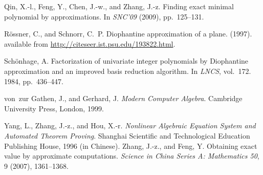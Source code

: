 \documentclass{sig-alternate}
\numberwithin{theorem}{section} \numberwithin{equation}{section}
\begin{document}
\begin{thebibliography}{10}
{\sc Qin, X.-l., Feng, Y., Chen, J.-w., and Zhang, J.-z.}
  Finding exact minimal polynomial by approximations.
  In {\em SNC'09\/} (2009), pp.~125--131.

{\sc R{\"o}ssner, C., and Schnorr, C.~P.}
  Diophantine approximation of a plane. (1997).
  available from \url{http://citeseer.ist.psu.edu/193822.html}.

{\sc Sch{\"o}nhage, A.}
  Factorization of univariate integer polynomials by Diophantine
  approximation and an improved basis reduction algorithm.
  In {\em LNCS}, vol.~172. 1984, pp.~436--447.



{\sc von~zur Gathen, J., and Gerhard, J.}
  {\em Modern Computer Algebra}.
  Cambridge University Press, London, 1999.

{\sc Yang, L., Zhang, J.-z., and Hou, X.-r.}
  {\em Nonlinear Algebraic Equation System and Automated Theorem
  Proving}.
  Shanghai Scientific and Technological Education Publishing House,
  1996 (in Chinese).
{\sc Zhang, J.-z., and Feng, Y.}
  Obtaining exact value by approximate computations.
  {\em Science in China Series A: Mathematics 50}, 9 (2007),
  1361--1368.

\end{thebibliography}

\balance
\end{document}
